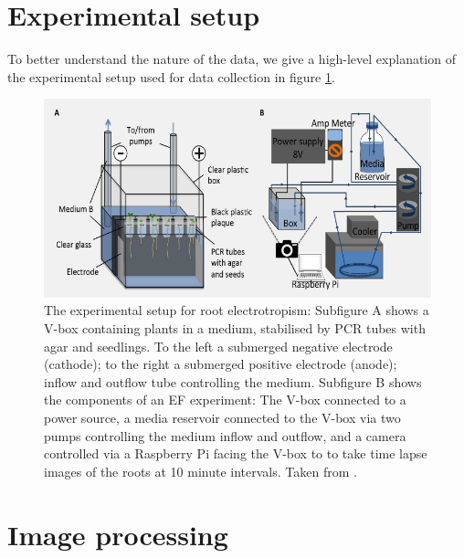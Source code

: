 \section{Experimental setup}\label{sec:experiment}

To better understand the nature of the data, we give a high-level explanation of the experimental setup used for data collection in figure \ref{fig:experiment}.

\begin{figure}[H]
	\centering
	\includegraphics[width=\textwidth]{../Figures/experiment_circuit.png}
	\caption{The experimental setup for root electrotropism: 
		Subfigure A shows a V-box containing plants in a medium, stabilised by PCR tubes with agar and seedlings. To the left a submerged negative electrode (cathode); to the right a submerged positive electrode (anode); inflow and outflow tube controlling the medium. 
		Subfigure B shows the components of an EF experiment: The V-box connected to a power source, a media reservoir connected to the V-box via two pumps controlling the medium inflow and outflow, and a camera controlled via a Raspberry Pi facing the V-box to to take time lapse images of the roots at 10 minute intervals. 
		Taken from \cite{GExpCircuit}.}
	\label{fig:experiment}
\end{figure}




\section{Image processing}

